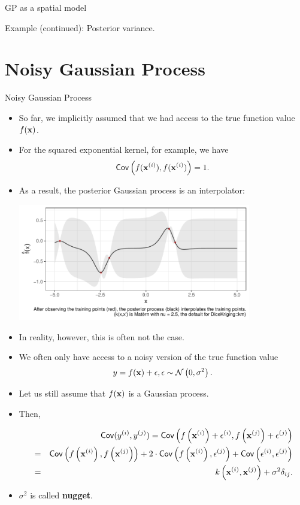 \begin{vbframe}{GP as a spatial model}
\begin{footnotesize}
Example (continued): Posterior variance. 
\end{footnotesize}


\end{vbframe}


\section{Noisy Gaussian Process}

\begin{vbframe}{Noisy Gaussian Process}

\begin{itemize}
  \item So far, we implicitly assumed that we had access to the true function value $\fx$.
  \item For the squared exponential kernel, for example, we have
  $$
    \cov\left(f(\xi), f(\xi)\right) = 1.
  $$
  \item As a result, the posterior Gaussian process is an interpolator: 
  \begin{center}
    \includegraphics[width=0.8\textwidth]{figure/gp_pred/gp_interpolator.pdf}
  \end{center}

\framebreak 

  \item In reality, however, this is often not the case. 
  \item We often only have access to a noisy version of the true function value
  $$
    y = \fx + \eps, \eps \sim\mathcal{N}\left(0, \sigma^2\right).
  $$
  \item Let us still assume that $\fx$ is a Gaussian process.
  \item Then,
  \begin{footnotesize} 
  \begin{eqnarray*}
    &&\cov(y^{(i)}, y^{(j)}) = \cov\left(f\left(\xi\right) + \epsilon^{(i)}, f\left(\xi[j]\right) + \epsilon^{(j)}\right) \\
    &=& \cov\left(f\left(\xi\right), f\left(\xi[j]\right)\right) + 2 \cdot \cov\left(f\left(\xi\right), \epsilon^{(j)}\right) + \cov\left(\epsilon^{(i)}, \epsilon^{(j)}\right) 
    \\ &=& k\left(\xi, \xi[j]\right) + \sigma^2 \delta_{ij}. 
  \end{eqnarray*}
  \end{footnotesize}
  \item $\sigma^2$ is called \textbf{nugget}. 
\end{itemize}


\end{vbframe}
